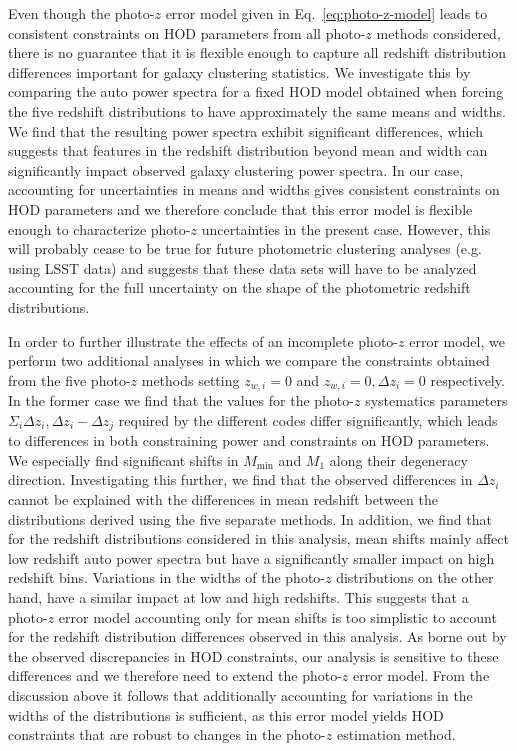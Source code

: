 \documentclass[a4paper,11pt]{article}
\begin{document}
Even though the photo-$z$ error model given in Eq.~\ref{eq:photo-z-model} leads to consistent constraints on HOD parameters from all photo-$z$ methods considered, there is no guarantee that it is flexible enough to capture all redshift distribution differences important for galaxy clustering statistics. We investigate this by comparing the auto power spectra for a fixed HOD model obtained when forcing the five redshift distributions to have approximately the same means and widths. We find that the resulting power spectra exhibit significant differences, which suggests that features in the redshift distribution beyond mean and width can significantly impact observed galaxy clustering power spectra. In our case, accounting for uncertainties in means and widths gives consistent constraints on HOD parameters and we therefore conclude that this error model is flexible enough to characterize photo-$z$ uncertainties in the present case. However, this will probably cease to be true for future photometric clustering analyses (e.g. using LSST data) and suggests that these data sets will have to be analyzed accounting for the full uncertainty on the shape of the photometric redshift distributions.

In order to further illustrate the effects of an incomplete photo-$z$ error model, we perform two additional analyses in which we compare the constraints obtained from the five photo-$z$ methods setting $z_{w, i} = 0$ and $z_{w, i} = 0, \Delta z_{i} = 0$ respectively. In the former case we find that the values for the photo-$z$ systematics parameters $\Sigma_{i} \Delta z_{i}, \Delta z_{i} - \Delta z_{j}$ required by the different codes differ significantly, which leads to differences in both constraining power and constraints on HOD parameters. We especially find significant shifts in $M_{\mathrm{min}}$ and $M_{1}$ along their degeneracy direction. Investigating this further, we find that the observed differences in $\Delta z_{i}$ cannot be explained with the differences in mean redshift between the distributions derived using the five separate methods. In addition, we find that for the redshift distributions considered in this analysis, mean shifts mainly affect low redshift auto power spectra but have a significantly smaller impact on high redshift bins. Variations in the widths of the photo-$z$ distributions on the other hand, have a similar impact at low and high redshifts. This suggests that a photo-$z$ error model accounting only for mean shifts is too simplistic to account for the redshift distribution differences observed in this analysis. As borne out by the observed discrepancies in HOD constraints, our analysis is sensitive to these differences and we therefore need to extend the photo-$z$ error model. From the discussion above it follows that additionally accounting for variations in the widths of the distributions is sufficient, as this error model yields HOD constraints that are robust to changes in the photo-$z$ estimation method.
\end{document}
